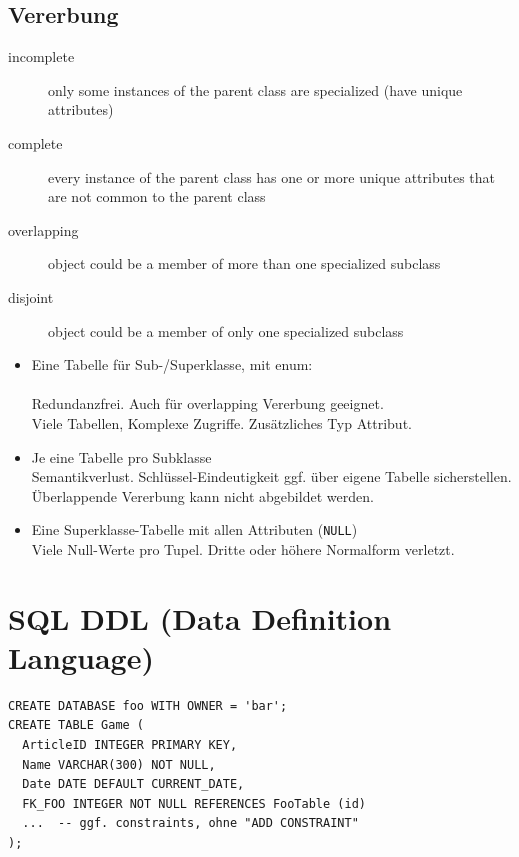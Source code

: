 \begin{multicols*}{3}
\subsection{Vererbung}
\begin{description}
    \item[incomplete] only some instances of the parent class are specialized (have unique attributes)
    \item[complete] every instance of the parent class has one or more unique attributes that are not common to the parent class
    \item[overlapping] object could be a member of more than one specialized subclass
    \item[disjoint] object could be a member of only one specialized subclass
\end{description}
\vspace{3pt}
\begin{itemize}
\item Eine Tabelle für Sub-/Superklasse, mit enum: \\
    \\
    Redundanzfrei. Auch für overlapping Vererbung geeignet.
    \\
    Viele Tabellen, Komplexe Zugriffe. Zusätzliches Typ Attribut.

\item Je eine Tabelle pro Subklasse\\
    Semantikverlust. Schlüssel-Eindeutigkeit ggf. über eigene Tabelle sicherstellen. Überlappende Vererbung kann nicht abgebildet werden.

\item Eine Superklasse-Tabelle mit allen Attributen (\verb!NULL!)\\
    Viele Null-Werte pro Tupel. Dritte oder höhere Normalform verletzt.
\end{itemize}

\section{SQL DDL (Data Definition Language)}

\begin{verbatim}
CREATE DATABASE foo WITH OWNER = 'bar';
CREATE TABLE Game (
  ArticleID INTEGER PRIMARY KEY,
  Name VARCHAR(300) NOT NULL,
  Date DATE DEFAULT CURRENT_DATE,
  FK_FOO INTEGER NOT NULL REFERENCES FooTable (id)
  ...  -- ggf. constraints, ohne "ADD CONSTRAINT"
);
\end{verbatim}


\end{multicols*}
